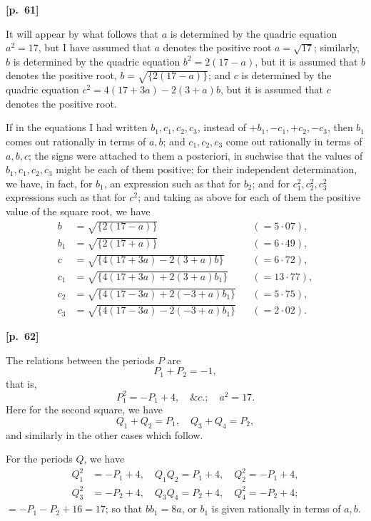 \documentclass[11pt,a4paper]{article}
\theoremstyle{plain}
\begin{document}
\vspace{0.5em}
\noindent\textbf{[p.\ 61]}

It will appear by what follows that $a$ is determined by the quadric equation $a^2 = 17$, but I have assumed that $a$ denotes the positive root $a = \sqrt{17}$; similarly, $b$ is determined by the quadric equation $b^2 = 2(17 - a)$, but it is assumed that $b$ denotes the positive root, $b = \sqrt{\{2(17 - a)\}}$; and $c$ is determined by the quadric equation $c^2 = 4(17 + 3a) - 2(3 + a)b$, but it is assumed that $c$ denotes the positive root.

If in the equations I had written $b_1, c_1, c_2, c_3$, instead of $+b_1, -c_1, +c_2, -c_3$, then $b_1$ comes out rationally in terms of $a, b$; and $c_1, c_2, c_3$ come out rationally in terms of $a, b, c$; the signs were attached to them a posteriori, in suchwise that the values of $b_1, c_1, c_2, c_3$ might be each of them positive; for their independent determination, we have, in fact, for $b_1$, an expression such as that for $b_2$; and for $c_1^2, c_2^2, c_3^2$ expressions such as that for $c^2$; and taking as above for each of them the positive value of the square root, we have
\begin{align*}
b &= \sqrt{\{2(17 - a)\}} && (= 5\cdot 07), \\
b_1 &= \sqrt{\{2(17 + a)\}} && (= 6\cdot 49), \\
c &= \sqrt{\{4(17 + 3a) - 2(3 + a)b\}} && (= 6\cdot 72), \\
c_1 &= \sqrt{\{4(17 + 3a) + 2(3 + a)b_1\}} && (= 13\cdot 77), \\
c_2 &= \sqrt{\{4(17 - 3a) + 2(-3 + a)b_1\}} && (= 5\cdot 75), \\
c_3 &= \sqrt{\{4(17 - 3a) - 2(-3 + a)b_1\}} && (= 2\cdot 02).
\end{align*}

\vspace{0.5em}
\noindent\textbf{[p.\ 62]}

The relations between the periods $P$ are
$$
P_1 + P_2 = -1,
$$
that is,
$$
P_1^2 = -P_1 + 4, \quad \&c.; \quad a^2 = 17.
$$
Here for the second square, we have
$$
Q_1 + Q_2 = P_1, \quad Q_3 + Q_4 = P_2,
$$
and similarly in the other cases which follow.

For the periods $Q$, we have
\begin{align*}
Q_1^2 &= -P_1 + 4, \quad Q_1 Q_2 = P_1 + 4, \quad Q_2^2 = -P_1 + 4, \\
Q_3^2 &= -P_2 + 4, \quad Q_3 Q_4 = P_2 + 4, \quad Q_4^2 = -P_2 + 4;
\end{align*}
$= -P_1 - P_2 + 16 = 17$; so that $bb_1 = 8a$, or $b_1$ is given rationally in terms of $a, b$.
\end{document}
